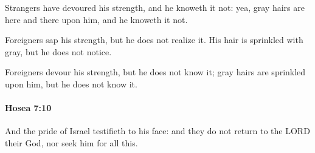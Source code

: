 			\begin{versebox}
					\item[BHS] 
					\item[LXX] 
					\item[ASV] Strangers have devoured his strength, and he knoweth it not: yea, gray hairs are here and there upon him, and he knoweth it not.
					\item[NIV] Foreigners sap his strength, but he does not realize it. His hair is sprinkled with gray, but he does not notice.
					\item[NRSV] Foreigners devour his strength, but he does not know it; gray hairs are sprinkled upon him, but he does not know it.
			\end{versebox}

		\paragraph{Hosea 7:10} %
			\label{HOSEA-7-10}

			And the pride of Israel testifieth to his face: and they do not return to the LORD their God, nor seek him for all this.

